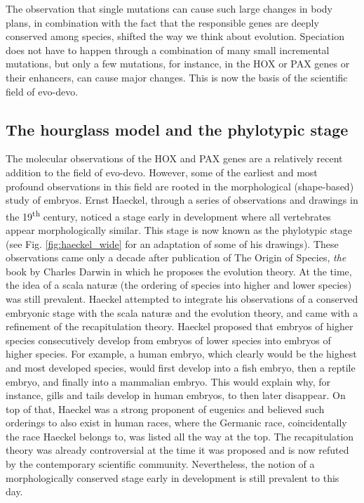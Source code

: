 The observation that single mutations can cause such large changes in body plans, in combination with the fact that the responsible genes are deeply conserved among species, shifted the way we think about evolution. Speciation does not have to happen through a combination of many small incremental mutations, but only a few mutations, for instance, in the HOX or PAX genes or their enhancers, can cause major changes. This is now the basis of the scientific field of evo-devo.

\subsection{The hourglass model and the phylotypic stage}

The molecular observations of the HOX and PAX genes are a relatively recent addition to the field of evo-devo. However, some of the earliest and most profound observations in this field are rooted in the morphological (shape-based) study of embryos. Ernst Haeckel, through a series of observations and drawings in the 19\textsuperscript{th} century\cite{haeckel1866}, noticed a stage early in development where all vertebrates appear morphologically similar. This stage is now known as the phylotypic stage (see Fig. \ref{fig:haeckel_wide} for an adaptation of some of his drawings). These observations came only a decade after publication of The Origin of Species, \textit{the} book by Charles Darwin in which he proposes the evolution theory. At the time, the idea of a scala naturæ (the ordering of species into higher and lower species) was still prevalent. Haeckel attempted to integrate his observations of a conserved embryonic stage with the scala naturæ and the evolution theory, and came with a refinement of the recapitulation theory. Haeckel proposed that embryos of higher species consecutively develop from embryos of lower species into embryos of higher species. For example, a human embryo, which clearly would be the highest and most developed species, would first develop into a fish embryo, then a reptile embryo, and finally into a mammalian embryo. This would explain why, for instance, gills and tails develop in human embryos, to then later disappear. On top of that, Haeckel was a strong proponent of eugenics and believed such orderings to also exist in human races, where the Germanic race, coincidentally the race Haeckel belongs to, was listed all the way at the top\cite{Levit2020}. The recapitulation theory was already controversial at the time it was proposed and is now refuted by the contemporary scientific community. Nevertheless, the notion of a morphologically conserved stage early in development is still prevalent to this day.

